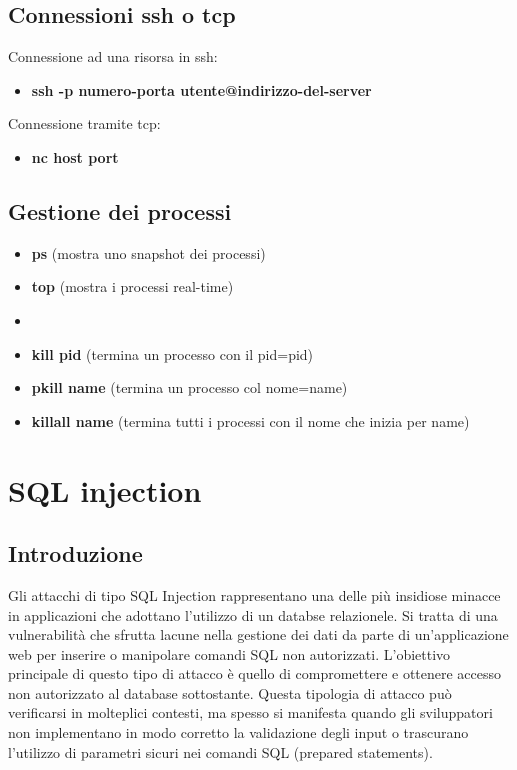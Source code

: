 \documentclass[oneside,a4paper,11pt]{book}
\theoremstyle{italicstyle}
\theoremstyle{normStyle}
\begin{document}
\section{Connessioni ssh o tcp}
Connessione ad una risorsa in ssh:

\begin{itemize}
    \item \textbf{ssh -p numero-porta utente@indirizzo-del-server}
\end{itemize}

Connessione tramite tcp:

\begin{itemize}
    \item \textbf{nc host port}
\end{itemize}

\section{Gestione dei processi}
\begin{itemize}
    \item \textbf{ps} (mostra uno snapshot dei processi)
    \item \textbf{top} (mostra i processi real-time)\item \textbf{}
    \item \textbf{kill pid} (termina un processo con il pid=pid)
    \item \textbf{pkill name} (termina un processo col nome=name)
    \item \textbf{killall name} (termina tutti i processi con il nome che inizia per name)
\end{itemize}
\chapter{SQL injection}
\section{Introduzione}
Gli attacchi di tipo SQL Injection rappresentano una delle più insidiose minacce in applicazioni che adottano l'utilizzo di un databse relazionele. Si tratta di una vulnerabilità che sfrutta lacune nella gestione dei dati da parte di un'applicazione web per inserire o manipolare comandi SQL non autorizzati. L'obiettivo principale di questo tipo di attacco è quello di compromettere e ottenere accesso non autorizzato al database sottostante.
Questa tipologia di attacco può verificarsi in molteplici contesti, ma spesso si manifesta quando gli sviluppatori non implementano in modo corretto la validazione degli input o trascurano l'utilizzo di  parametri sicuri nei comandi SQL (prepared statements).
\end{document}
